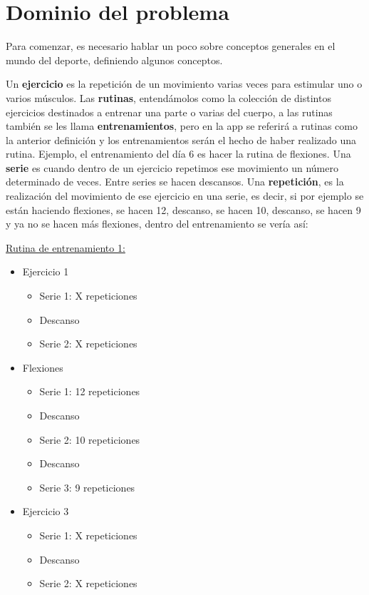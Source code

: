 \section{Dominio del problema}
Para comenzar, es necesario hablar un poco sobre conceptos generales en el mundo del deporte, definiendo algunos conceptos.

Un \textbf{ejercicio} es la repetición de un movimiento varias veces para estimular uno o varios músculos. Las \textbf{rutinas}, entendámolos como la colección de distintos ejercicios destinados a entrenar una parte o varias del cuerpo, a las rutinas también se les llama \textbf{entrenamientos}, pero en la app se referirá a rutinas como la anterior definición y los entrenamientos serán el hecho de haber realizado una rutina. Ejemplo, el entrenamiento del día 6 es hacer la rutina de flexiones. Una \textbf{serie} es cuando dentro de un ejercicio repetimos ese movimiento un número determinado de veces. Entre series se hacen descansos. Una \textbf{repetición}, es la realización del movimiento de ese ejercicio en una serie, es decir, si por ejemplo se están haciendo flexiones, se hacen 12, descanso, se hacen 10, descanso, se hacen 9 y ya no se hacen más flexiones, dentro del entrenamiento se vería así:

\underline {Rutina de entrenamiento 1:}
\begin{itemize}
	\item Ejercicio 1
	\begin{itemize}
		\item Serie 1: X repeticiones
		\item Descanso
		\item Serie 2: X repeticiones
	\end{itemize}
	\item Flexiones
	\begin{itemize}
		\item Serie 1: 12 repeticiones
		\item Descanso
		\item Serie 2: 10 repeticiones 
		\item Descanso
		\item Serie 3: 9 repeticiones
	\end{itemize}
	\item Ejercicio 3
	\begin{itemize}
		\item Serie 1: X repeticiones
		\item Descanso
		\item Serie 2: X repeticiones
	\end{itemize}
\end{itemize}

